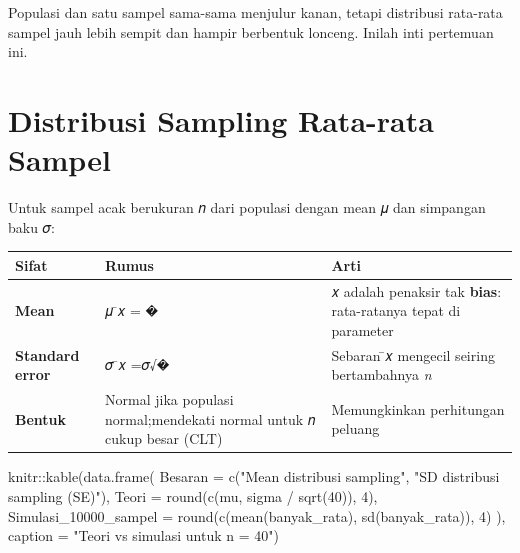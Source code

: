 \documentclass[
  indonesian,
  letterpaper,
]{book}
\newenvironment{Shaded}{\begin{snugshade}}{\end{snugshade}}
\newcommand{\AttributeTok}[1]{\textcolor[rgb]{0.40,0.45,0.13}{#1}}
\newcommand{\DecValTok}[1]{\textcolor[rgb]{0.68,0.00,0.00}{#1}}
\newcommand{\FunctionTok}[1]{\textcolor[rgb]{0.28,0.35,0.67}{#1}}
\newcommand{\NormalTok}[1]{\textcolor[rgb]{0.00,0.23,0.31}{#1}}
\newcommand{\SpecialCharTok}[1]{\textcolor[rgb]{0.37,0.37,0.37}{#1}}
\newcommand{\StringTok}[1]{\textcolor[rgb]{0.13,0.47,0.30}{#1}}
\newcounter{none} %
\begin{document}
Populasi dan satu sampel sama-sama menjulur kanan, tetapi distribusi
rata-rata sampel jauh lebih sempit dan hampir berbentuk lonceng. Inilah
inti pertemuan ini.


\chapter{Distribusi Sampling Rata-rata
Sampel}\label{distribusi-sampling-rata-rata-sampel}

Untuk sampel acak berukuran 𝑛 dari populasi dengan mean 𝜇 dan simpangan
baku 𝜎:

{\def\LTcaptype{none} %
\begin{longtable}[]{@{}
  >{\raggedright\arraybackslash}p{}
  >{\raggedright\arraybackslash}p{}
  >{\raggedright\arraybackslash}p{}@{}}
\toprule\noalign{}
\begin{minipage}[b]{\linewidth}\raggedright
Sifat
\end{minipage} & \begin{minipage}[b]{\linewidth}\raggedright
Rumus
\end{minipage} & \begin{minipage}[b]{\linewidth}\raggedright
Arti
\end{minipage} \\
\midrule\noalign{}
\endhead
\bottomrule\noalign{}
\endlastfoot
\textbf{Mean} & 𝜇 ̄𝑥 = � & 𝑥 adalah penaksir tak \textbf{bias}:
rata-ratanya tepat di parameter \\
\textbf{Standard error} & 𝜎 ̄𝑥 =𝜎√� & Sebaran ̄𝑥 mengecil seiring
bertambahnya \emph{n} \\
\textbf{Bentuk } & Normal jika populasi normal;mendekati normal untuk 𝑛
cukup besar (CLT) & Memungkinkan perhitungan peluang \\
\end{longtable}
}

\begin{Shaded}
\begin{Highlighting}[]
\NormalTok{knitr}\SpecialCharTok{::}\FunctionTok{kable}\NormalTok{(}\FunctionTok{data.frame}\NormalTok{(}
\AttributeTok{Besaran =} \FunctionTok{c}\NormalTok{(}\StringTok{"Mean distribusi sampling"}\NormalTok{, }\StringTok{"SD distribusi sampling (SE)"}\NormalTok{),}
\AttributeTok{Teori =} \FunctionTok{round}\NormalTok{(}\FunctionTok{c}\NormalTok{(mu, sigma }\SpecialCharTok{/} \FunctionTok{sqrt}\NormalTok{(}\DecValTok{40}\NormalTok{)), }\DecValTok{4}\NormalTok{),}
\AttributeTok{Simulasi\_10000\_sampel =} \FunctionTok{round}\NormalTok{(}\FunctionTok{c}\NormalTok{(}\FunctionTok{mean}\NormalTok{(banyak\_rata), }\FunctionTok{sd}\NormalTok{(banyak\_rata)), }\DecValTok{4}\NormalTok{)}
\NormalTok{), }\AttributeTok{caption =} \StringTok{"Teori vs simulasi untuk n = 40"}\NormalTok{)}
\end{Highlighting}
\end{Shaded}
\end{document}

